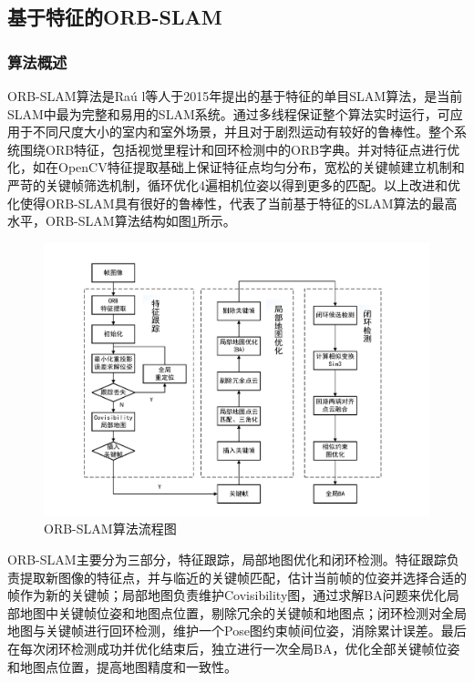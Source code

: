 \subsection{基于特征的ORB-SLAM}

\subsubsection*{算法概述}
ORB-SLAM算法是Ra\'u l等人于2015年提出的基于特征的单目SLAM算法，是当前SLAM中最为完整和易用的SLAM系统。通过多线程保证整个算法实时运行，可应用于不同尺度大小的室内和室外场景，并且对于剧烈运动有较好的鲁棒性。整个系统围绕ORB特征\upcite{[3.8]}，包括视觉里程计和回环检测中的ORB字典\upcite{[3.9]}。并对特征点进行优化，如在OpenCV特征提取基础上保证特征点均匀分布，宽松的关键帧建立机制和严苛的关键帧筛选机制，循环优化4遍相机位姿以得到更多的匹配。以上改进和优化使得ORB-SLAM具有很好的鲁棒性，代表了当前基于特征的SLAM算法的最高水平，ORB-SLAM算法结构如图\ref{fig3.6}所示。

\begin{figure}[h]
\centering
\includegraphics[scale=0.5,angle=-90]{figures/Fig3-6.pdf}
\caption{ORB-SLAM算法流程图\upcite{[1.20]}}
\label{fig3.6}
\end{figure}

ORB-SLAM主要分为三部分，特征跟踪，局部地图优化和闭环检测。特征跟踪负责提取新图像的特征点，并与临近的关键帧匹配，估计当前帧的位姿并选择合适的帧作为新的关键帧；局部地图负责维护Covisibility图，通过求解BA问题来优化局部地图中关键帧位姿和地图点位置，剔除冗余的关键帧和地图点；闭环检测对全局地图与关键帧进行回环检测，维护一个Pose图约束帧间位姿，消除累计误差。最后在每次闭环检测成功并优化结束后，独立进行一次全局BA，优化全部关键帧位姿和地图点位置，提高地图精度和一致性。


